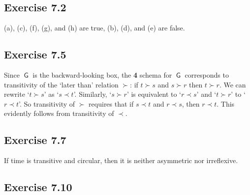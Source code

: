 \documentclass{scrartcl}
\DeclareMathOperator{\tG}{\mathsf{G}}
\begin{document}
  \subsection*{Exercise 7.2}

%
%
  (a), (c), (f), (g), and (h) are true, (b), (d), and (e) are false.

  \subsection*{Exercise 7.5}

%
%
  Since $\tG$ is the backward-looking box, the \textbf{4} schema for $\tG$
  corresponds to transitivity of the `later than' relation $\succ$: if
  $t \succ s$ and $s\succ r$ then $t \succ r$. We can rewrite `$t \succ s$' as
  `$s\prec t$'. Similarly, `$s\succ r$' is equivalent to `$r \prec s$' and
  `$t \succ r$' to `$r \prec t$'. So transitivity of $\succ$ requires that if
  $s \prec t$ and $r\prec s$, then $r\prec t$. This evidently follows from
  transitivity of $\prec$.

  \subsection*{Exercise 7.7}

%
%
  If time is transitive and circular, then it is neither asymmetric nor
  irreflexive.

  \subsection*{Exercise 7.10}
\end{document}
